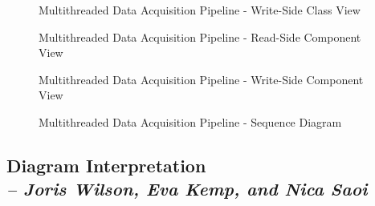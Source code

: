 \begin{figure}[!htbp]
  \centering
  \caption{Multithreaded Data Acquisition Pipeline - Write-Side Class View}
  \label{fig:multithreaded_pipeline_write_class}
\end{figure}

\begin{figure}[!htbp]
  \centering
  \caption{Multithreaded Data Acquisition Pipeline - Read-Side Component View}
  \label{fig:multithreaded_pipeline_read_component}
\end{figure}

\begin{figure}[!htbp]
  \centering
  \caption{Multithreaded Data Acquisition Pipeline - Write-Side Component View}
  \label{fig:multithreaded_pipeline_write_component}
\end{figure}

\begin{figure}[!htbp]
  \centering
  
  \caption{Multithreaded Data Acquisition Pipeline - Sequence Diagram}
  \label{fig:multithreaded_pipeline_sequence}
\end{figure}

\subsection{Diagram Interpretation \\
\small{\textit{-- Joris Wilson, Eva Kemp, and Nica Saoi}}}
\label{Section::Diagram Interpretation}

